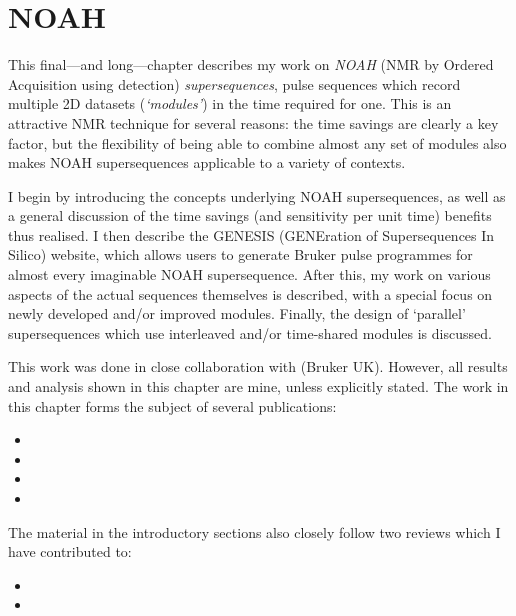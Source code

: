 \chapter{NOAH}
\label{chpt:noah}

This final---and long---chapter describes my work on \textit{NOAH} (NMR by Ordered Acquisition using \proton{} detection) \textit{supersequences}, pulse sequences which record multiple 2D datasets (\textit{`modules'}) in the time required for one.
This is an attractive NMR technique for several reasons: the time savings are clearly a key factor, but the flexibility of being able to combine almost any set of modules also makes NOAH supersequences applicable to a variety of contexts.

I begin by introducing the concepts underlying NOAH supersequences, as well as a general discussion of the time savings (and sensitivity per unit time) benefits thus realised.
I then describe the GENESIS (GENEration of Supersequences In Silico) website, which allows users to generate Bruker pulse programmes for almost every imaginable NOAH supersequence.
After this, my work on various aspects of the actual sequences themselves is described, with a special focus on newly developed and/or improved modules.
Finally, the design of `parallel' supersequences which use interleaved and/or time-shared modules is discussed.

This work was done in close collaboration with \EK{} (Bruker UK).
However, all results and analysis shown in this chapter are mine, unless explicitly stated.
The work in this chapter forms the subject of several publications:

\begin{itemize}
    \item {}
    \item {}
    \item {}
    \item {}
\end{itemize}

The material in the introductory sections also closely follow two reviews which I have contributed to:
\begin{itemize}
    \item {}
    \item {}
\end{itemize}

\clearpage








\printbibliography[heading=subbibnumbered]{}
